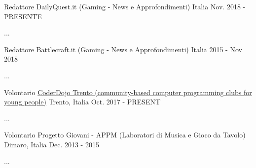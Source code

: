 

\begin{cventries}

  \cventry
    {Redattore} %
    {DailyQuest.it (Gaming - News e Approfondimenti)} %
    {Italia} %
    {Nov. 2018 - PRESENTE} %
    {
      \begin{cvitems} %
        \item {...}
      \end{cvitems}
    }

  \cventry
    {Redattore} %
    {Battlecraft.it (Gaming - News e Approfondimenti)} %
    {Italia} %
    {2015 - Nov 2018} %
    {
      \begin{cvitems} %
        \item {...}
      \end{cvitems}
    }

  \cventry
    {Volontario} %
    {\href{https://www.coderdojotrento.it/}{CoderDojo Trento (community-based computer programming clubs for young people)}} %
    {Trento, Italia} %
    {Oct. 2017 - PRESENT} %
    {
      \begin{cvitems} %
        \item {...}
      \end{cvitems}
    }

  \cventry
    {Volontario} %
    {Progetto Giovani - APPM (Laboratori di Musica e Gioco da Tavolo)} %
    {Dimaro, Italia} %
    {Dec. 2013 - 2015} %
    {
      \begin{cvitems} %
        \item {...}
      \end{cvitems}
    }

\end{cventries}